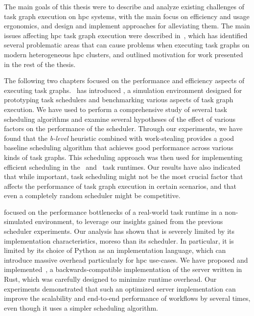 The main goals of this thesis were to describe and analyze existing challenges of task graph
execution on \gls{hpc} systems, with the main focus on efficiency and usage
ergonomics, and design and implement approaches for alleviating them. The main issues affecting
\gls{hpc} task graph execution were described in~, which
has identified several problematic areas that can cause problems when executing task graphs on
modern heterogeneous \gls{hpc} clusters, and outlined motivation for work
presented in the rest of the thesis.

The following two chapters focused on the performance and efficiency aspects of executing task
graphs.~ has introduced \estee{}, a simulation
environment designed for prototyping task schedulers and benchmarking various aspects of task graph
execution. We have used \estee{} to perform a comprehensive study of several task
scheduling algorithms and examine several hypotheses of the effect of various factors on the
performance of the scheduler. Through our experiments, we have found that the
\emph{b-level} heuristic combined with work-stealing provides a good baseline
scheduling algorithm that achieves good performance across various kinds of task graphs. This
scheduling approach was then used for implementing efficient scheduling in
the~\rsds{} and~\hyperqueue{} task runtimes. Our results have also
indicated that while important, task scheduling might not be the most crucial factor that affects
the performance of task graph execution in certain scenarios, and that even a completely random
scheduler might be competitive.

 focused on the performance bottlenecks of a real-world task runtime
\dask{} in a non-simulated
environment, to leverage our insights gained from the previous scheduler experiments. Our analysis
has shown that \dask{} is severely limited by its implementation
characteristics, moreso than its scheduler. In particular, it is limited by its choice of Python as
an implementation language, which can introduce massive overhead particularly for
\gls{hpc} use-cases. We have proposed and implemented~\rsds{},
a backwards-compatible implementation of the \dask{} server written in Rust,
which was carefully designed to minimize runtime overhead. Our experiments demonstrated that such
an optimized server implementation can improve the scalability and end-to-end performance of
\dask{} workflows by several times, even though it uses a simpler scheduling
algorithm.

